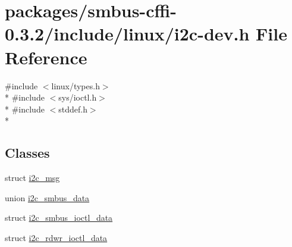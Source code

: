 \hypertarget{smbus-cffi-0_83_82_2include_2linux_2i2c-dev_8h}{}\section{packages/smbus-\/cffi-\/0.3.2/include/linux/i2c-\/dev.h File Reference}
\label{smbus-cffi-0_83_82_2include_2linux_2i2c-dev_8h}
{\ttfamily \#include $<$linux/types.\+h$>$}\\*
{\ttfamily \#include $<$sys/ioctl.\+h$>$}\\*
{\ttfamily \#include $<$stddef.\+h$>$}\\*
\subsection*{Classes}
\begin{DoxyCompactItemize}
\item 
struct \hyperlink{structi2c__msg}{i2c\+\_\+msg}
\item 
union \hyperlink{unioni2c__smbus__data}{i2c\+\_\+smbus\+\_\+data}
\item 
struct \hyperlink{structi2c__smbus__ioctl__data}{i2c\+\_\+smbus\+\_\+ioctl\+\_\+data}
\item 
struct \hyperlink{structi2c__rdwr__ioctl__data}{i2c\+\_\+rdwr\+\_\+ioctl\+\_\+data}
\end{DoxyCompactItemize}
